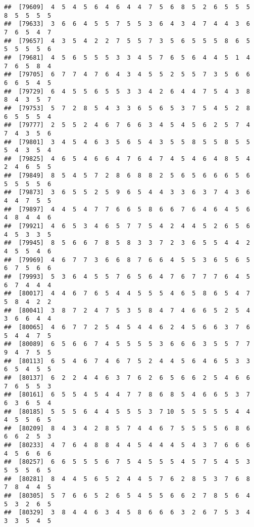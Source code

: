 \documentclass[
]{book}
\begin{document}
\begin{verbatim}
##  [79609]  4  5  4  5  6  4  6  4  4  7  5  6  8  5  2  6  5  5  5  8  5  5  5  5
##  [79633]  3  6  6  4  5  5  7  5  5  3  6  4  3  4  7  4  4  3  6  7  6  5  4  7
##  [79657]  4  3  5  4  2  2  7  5  5  7  3  5  6  5  5  5  8  6  5  5  5  5  5  6
##  [79681]  4  5  6  5  5  5  3  3  4  5  7  6  5  6  4  4  5  1  4  7  6  5  8  4
##  [79705]  6  7  7  4  7  6  4  3  4  5  5  2  5  5  7  3  5  6  6  6  6  5  4  5
##  [79729]  6  4  5  5  6  5  5  3  3  4  2  6  4  4  7  5  4  3  8  8  4  3  5  7
##  [79753]  5  7  2  8  5  4  3  3  6  5  6  5  3  7  5  4  5  2  8  6  5  5  5  4
##  [79777]  2  5  5  2  4  6  7  6  6  3  4  5  4  5  6  2  5  7  4  7  4  3  5  6
##  [79801]  3  4  5  4  6  3  5  6  5  4  3  5  5  8  5  5  8  5  5  5  4  3  5  4
##  [79825]  4  6  5  4  6  6  4  7  6  4  7  4  5  4  6  4  8  5  4  2  4  6  5  5
##  [79849]  8  5  4  5  7  2  8  6  8  8  2  5  6  5  6  6  6  5  6  5  5  5  5  6
##  [79873]  3  6  5  5  2  5  9  6  5  4  4  3  3  6  3  7  4  3  6  4  4  7  5  5
##  [79897]  4  4  5  4  7  7  6  6  5  8  6  6  7  6  4  6  4  5  6  4  8  4  4  6
##  [79921]  4  6  5  3  4  6  5  7  7  5  4  2  4  4  5  2  6  5  6  4  5  3  3  5
##  [79945]  8  5  6  6  7  8  5  8  3  3  7  2  3  6  5  5  4  4  2  4  5  5  4  6
##  [79969]  4  6  7  7  3  6  6  8  7  6  6  4  5  5  3  6  5  6  5  6  7  5  6  6
##  [79993]  5  3  6  4  5  5  7  6  5  6  4  7  6  7  7  7  6  4  5  6  7  4  4  4
##  [80017]  4  4  6  7  6  5  4  4  5  5  5  4  6  5  8  6  5  4  7  5  8  4  2  2
##  [80041]  3  8  7  2  4  7  5  3  5  8  4  7  4  6  6  5  2  5  4  3  6  6  4  4
##  [80065]  4  6  7  7  2  5  4  5  4  4  6  2  4  5  6  6  3  7  6  5  4  4  7  5
##  [80089]  6  5  6  6  7  4  5  5  5  5  3  6  6  6  3  5  5  7  7  9  4  7  5  5
##  [80113]  6  5  4  6  7  4  6  7  5  2  4  4  5  6  4  6  5  3  3  6  5  4  5  5
##  [80137]  6  2  2  4  4  6  3  7  6  2  6  5  6  6  2  5  4  6  6  7  6  5  5  3
##  [80161]  6  5  5  4  5  4  4  7  7  8  6  8  5  4  6  6  5  3  7  6  3  6  5  4
##  [80185]  5  5  5  6  4  4  5  5  5  3  7 10  5  5  5  5  5  4  4  4  5  5  6  5
##  [80209]  8  4  3  4  2  8  5  7  4  4  6  7  5  5  5  5  6  8  6  6  6  2  5  3
##  [80233]  4  7  6  4  8  8  4  4  5  4  4  4  5  4  3  7  6  6  6  4  5  6  6  6
##  [80257]  6  6  5  5  5  6  7  5  4  5  5  5  4  5  7  5  4  5  3  5  5  5  6  5
##  [80281]  8  4  4  5  6  5  2  4  4  5  7  6  2  8  5  3  7  6  8  7  8  4  4  5
##  [80305]  5  7  6  6  5  2  6  5  4  5  5  6  6  2  7  8  5  6  4  5  3  2  6  5
##  [80329]  3  8  4  4  6  3  4  5  8  6  6  6  3  2  6  7  5  3  4  3  3  5  4  5

\end{verbatim}
\end{document}
